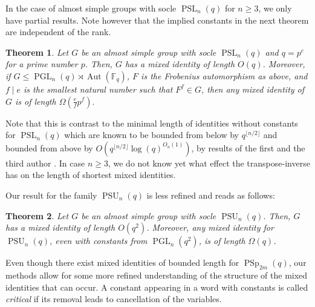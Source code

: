 \documentclass[a4paper,11pt]{amsproc}
\newcommand{\finfield}{\mathbb{F}}%
\newcommand{\floor}[1]{\lfloor#1\rfloor}%
\DeclareMathOperator{\PSp}{PSp}%
\DeclareMathOperator{\PSU}{PSU}%
\DeclareMathOperator{\Aut}{Aut}%
\DeclareMathOperator{\PSL}{PSL}%
\DeclareMathOperator{\PGL}{PGL}%
\theoremstyle{plain}
\newtheorem{theorem}{Theorem}
\theoremstyle{definition}
\begin{document}
	In the case of almost simple groups with socle $\PSL_n(q)$ for $n \geq 3$, we only have partial results. Note however that the implied constants in the next theorem are independent of the rank.
	
	\begin{theorem} \label{thm:psl}
		Let $G$ be an almost simple group with socle $\PSL_n(q)$ and $q=p^e$ for a prime number $p$. Then, $G$ has a mixed identity of length $O(q)$. Moreover, if $G \le \PGL_n(q)\rtimes\Aut(\finfield_q)$, $F$ is the Frobenius automorphism as above, and $f\mid e$ is the smallest natural number such that $F^f \in G$, then any mixed identity of $G$ is of length $\Omega(\frac{e}{f} p^f).$
	\end{theorem}
	
	
	Note that this is contrast to the minimal length of identities without constants for $\PSL_n(q)$ which are known to be bounded from below by $q^{\floor{n/2}}$ and bounded from above by $O(q^{\floor{n/2}}\log(q)^{O_n(1)})$, by results of the first and the third author \cite{bradford2019lie}. In case $n\geq 3$, we do not know yet what effect the transpose-inverse has on the length of shortest mixed identities.
	
	Our result for the family $\PSU_n(q)$ is less refined and reads as follows:
	
	\begin{theorem}\label{thm:unitry_groups_main_thm}
		Let $G$ be an almost simple group with socle $\PSU_n(q)$. Then, $G$ has a mixed identity of length $O(q^2)$. Moreover, any mixed identity for $\PSU_n(q)$, even with constants from $\PGL_n(q^2)$, is of length $\Omega(q)$.
	\end{theorem}
	
	Even though there exist mixed identities of bounded length for $\PSp_{2m}(q)$, our methods allow for some more refined understanding of the structure of the mixed identities that can occur. A constant appearing in a word with constants is called \emph{critical} if its removal leads to cancellation of the variables.
	
\end{document}
